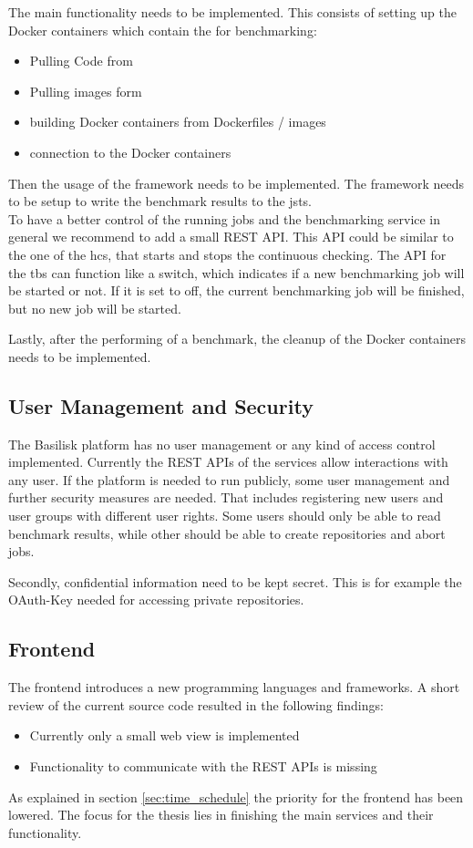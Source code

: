 The main functionality needs to be implemented.
This consists of setting up the Docker containers which contain the \tsp{} for benchmarking:

\begin{itemize}
	\item Pulling Code from \gh{}
	\item Pulling images form \dockh{}
	
	\item building Docker containers from Dockerfiles / images
	
	\item connection to the Docker containers
\end{itemize}

Then the usage of the \iguana{} framework needs to be implemented.
The framework needs to be setup to write the benchmark results to the \acl{jsts}.
\\

To have a better control of the running jobs and the benchmarking service in general we recommend to add a small REST API.
This API could be similar to the one of the \ac{hcs}, that starts and stops the continuous checking.
The API for the \ac{tbs} can function like a switch, which indicates if a new benchmarking job will be started or not.
If it is set to off, the current benchmarking job will be finished, but no new job will be started.

Lastly, after the performing of a benchmark, the cleanup of the Docker containers needs to be implemented.

\subsection{User Management and Security}
\label{sec:review_user_management}
The Basilisk platform has no user management or any kind of access control implemented.
Currently the REST APIs of the services allow interactions with any user.
If the platform is needed to run publicly, some user management and further security measures are needed.
That includes registering new users and user groups with different user rights.
Some users should only be able to read benchmark results, while other should be able to create repositories and abort jobs.

Secondly, confidential information need to be kept secret.
This is for example the OAuth-Key needed for accessing private \gh{} repositories.


\subsection{Frontend}
\label{sec:review_frontend}
The frontend introduces a new programming languages and frameworks.
A short review of the current source code resulted in the following findings:
\begin{itemize}
	\item Currently only a small web view is implemented
	\item Functionality to communicate with the REST APIs is missing
\end{itemize}


As explained in section \ref{sec:time_schedule} the priority for the frontend has been lowered.
The focus for the thesis lies in finishing the main services and their functionality.


